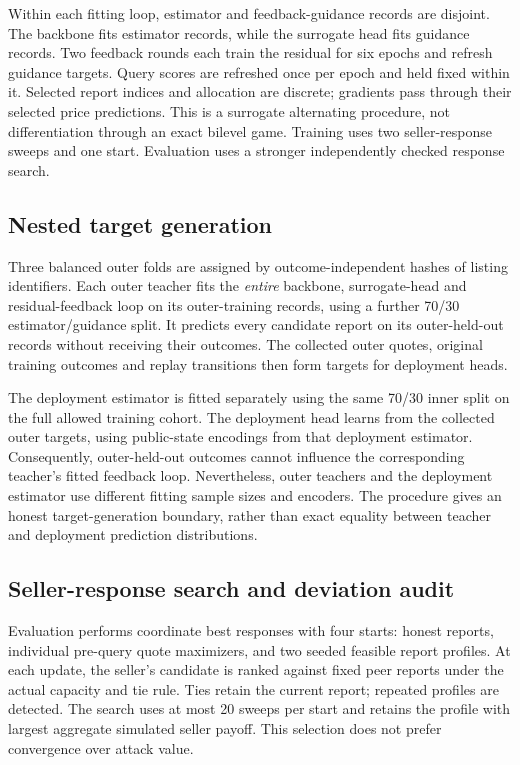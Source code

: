 Within each fitting loop, estimator and feedback-guidance records are
disjoint. The backbone fits estimator records, while the surrogate head fits
guidance records. Two feedback rounds each train the residual for six epochs
and refresh guidance targets. Query scores are refreshed once per epoch and
held fixed within it. Selected report indices and allocation are discrete;
gradients pass through their selected price predictions. This is a surrogate
alternating procedure, not differentiation through an exact bilevel game.
Training uses two seller-response sweeps and one start. Evaluation uses a
stronger independently checked response search.

\subsection{Nested target generation}
Three balanced outer folds are assigned by outcome-independent hashes of
listing identifiers. Each outer teacher fits the \emph{entire} backbone,
surrogate-head and residual-feedback loop on its outer-training records,
using a further 70/30 estimator/guidance split. It predicts every candidate
report on its outer-held-out records without receiving their outcomes.
The collected outer quotes, original training outcomes and replay transitions
then form targets for deployment heads.

The deployment estimator is fitted separately using the same 70/30 inner
split on the full allowed training cohort. The deployment head learns from
the collected outer targets, using public-state encodings from that
deployment estimator. Consequently, outer-held-out outcomes cannot influence
the corresponding teacher's fitted feedback loop. Nevertheless, outer
teachers and the deployment estimator use different fitting sample sizes and
encoders. The procedure gives an honest target-generation boundary, rather
than exact equality between teacher and deployment prediction distributions.

\subsection{Seller-response search and deviation audit}
Evaluation performs coordinate best responses with four starts: honest
reports, individual pre-query quote maximizers, and two seeded feasible
report profiles. At each update, the seller's candidate is ranked against
fixed peer reports under the actual capacity and tie rule. Ties retain the
current report; repeated profiles are detected. The search uses at most
20 sweeps per start and retains the profile with largest aggregate simulated
seller payoff. This selection does not prefer convergence over attack value.

